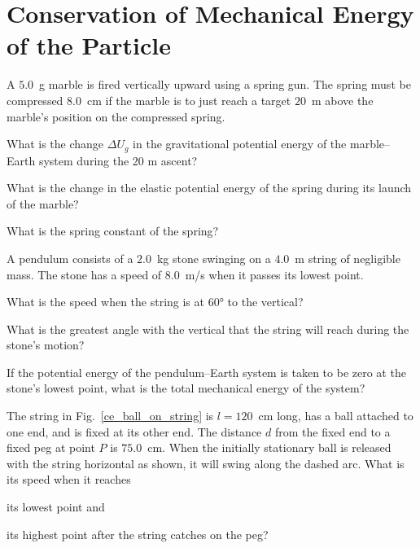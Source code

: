 \section{Conservation of Mechanical Energy of the Particle}


\begin{problem}
	A $5.0$~g marble is fired vertically upward using a spring gun. The spring must be compressed $8.0$~cm if the marble is to just reach a target $20$~m above the marble's position on the compressed spring. 
	\begin{enumerate*}[label=(\alph*)]
		\item What is the change $\Delta U_g$ in the gravitational potential energy of the marble–Earth system during the 20 m ascent? 
		\item What is the change in the elastic potential energy of the spring during its launch of the marble?
		\item What is the spring constant of the spring?
	\end{enumerate*}
\end{problem}


\begin{problem}
	A pendulum consists of a $2.0$~kg stone swinging on a $4.0$~m string of negligible mass. The stone has a speed of $8.0$~m/s when it passes its lowest point. 
	\begin{enumerate*}[label=(\alph*)]
		\item What is the speed when the string is at $\ang{60}$ to the vertical?
		\item  What is the greatest angle with the vertical that the string will reach during the stone’s motion?
		\item If the potential energy of the pendulum–Earth system is taken to be zero at the stone’s lowest point, what is the total mechanical energy of the system?
	\end{enumerate*}
\end{problem}


\begin{problem}\label{prb:ce_ball_on_string}
	The string in Fig.~\ref{ce_ball_on_string} is $l = 120$~cm long, has a ball attached to one end, and is fixed at its other end. The distance $d$ from the fixed end to a fixed peg at point $P$ is $75.0$~cm. When the initially stationary ball is released with the string horizontal as shown, it will swing along the dashed arc. What is its speed when it reaches 
	\begin{enumerate*}[label=(\alph*)]
		\item its lowest point and
		\item its highest point after the string catches on the peg?
	\end{enumerate*}
\end{problem}


